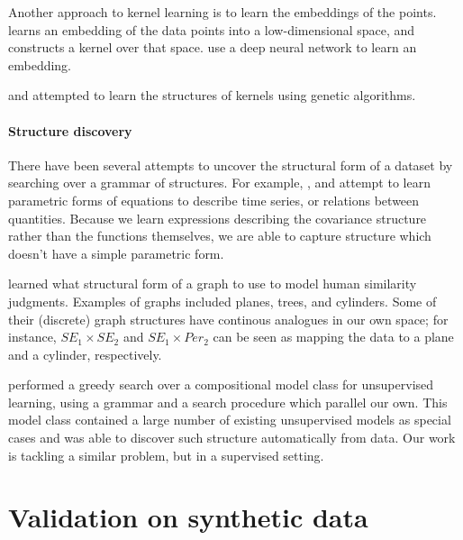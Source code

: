 \documentclass[twoside]{article}
\begin{document}
Another approach to kernel learning is to learn the embeddings of the points. 
 learns an embedding of the data points into a low-dimensional space, and constructs a kernel over that space. 
\citet{salakhutdinov2008using} use a deep neural network to learn an embedding. 

\citet{diosan2007evolving} and \citet{bing2010gp} attempted to learn the structures of kernels using genetic algorithms.  


\paragraph{Structure discovery}

There have been several attempts to uncover the structural form of a dataset by searching over a grammar of structures. For example, \cite{schmidt2009distilling}, \cite{todorovski1997declarative} and \cite{washio1999discovering} attempt to learn parametric forms of equations to describe time series, or relations between quantities. Because we learn expressions describing the covariance structure rather than the functions themselves, we are able to capture structure which doesn't have a simple parametric form.

\citet{kemp2008discovery} learned what structural form of a graph to use to model human similarity judgments. Examples of graphs included planes, trees, and cylinders. Some of their (discrete) graph structures have continous analogues in our own space; for instance, $SE_1 \times SE_2$ and $SE_1 \times Per_2$ can be seen as mapping the data to a plane and a cylinder, respectively.

\citet{grosse2012exploiting} performed a greedy search over a compositional model class for unsupervised learning, using a grammar and a search procedure which parallel our own. This model class contained a large number of existing unsupervised models as special cases and was able to discover such structure automatically from data. Our work is tackling a similar problem, but in a supervised setting.

\section{Validation on synthetic data}
\label{sec:synthetic}
\end{document}
